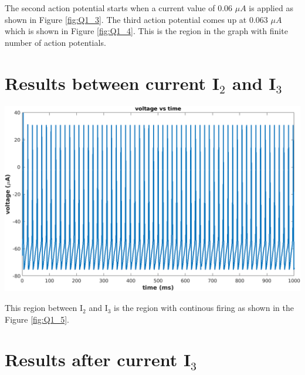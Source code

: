 \documentclass[12pt, a4paper]{article}
\begin{document}
The second action potential starts when a current value of 0.06 $ \mu A $ is applied as shown in Figure \ref{fig:Q1_3}. The third action potential comes up at 0.063 $ \mu A $ which is shown in Figure \ref{fig:Q1_4}. This is the region in the graph with finite number of action potentials.


\section{Results between current I$_2$ and I$_3$}
\label {I2-I3 results}
\vspace{0.5em}

\begin{center}
\begin{minipage}{0.70\linewidth}
    \includegraphics[width=\textwidth]{Q1_5}
    \label{fig:Q1_5}
\end{minipage}
\end{center}

\vspace{1em}

This region between I$_{2}$ and I$_3$ is the region with continous firing as shown in the Figure \ref{fig:Q1_5}.

\section{Results after current I$_3$ }
\label {I3 results}
\vspace{0.5em}
\end{document}
